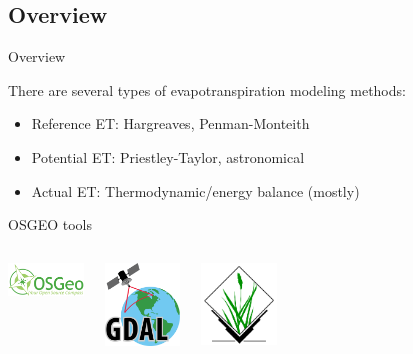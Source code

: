 \documentclass[xcolor=dvipsnames,beamer]{beamer} %
\begin{document}
\subsection{Overview}
\begin{frame}[fragile]{Overview}

There are several types of evapotranspiration modeling methods:\\

\begin{itemize}
 \item Reference ET: Hargreaves, Penman-Monteith
 \item Potential ET: Priestley-Taylor, astronomical
 \item Actual ET: Thermodynamic/energy balance (mostly)
\end{itemize}

\begin{block}{OSGEO tools}
\begin{columns}[l]
\begin{center}
\includegraphics[width=2cm]{OSGeo_logo}
\end{center}
\begin{center}
\includegraphics[width=2cm]{GDALLogoColor}
\end{center}
\begin{center}
\includegraphics[width=2cm]{Grass_GIS}
\end{center}
\end{columns}
\end{block}
\end{frame}
\end{document}
